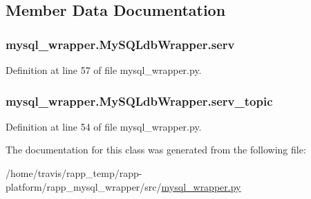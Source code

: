 \subsection{Member Data Documentation}
\hypertarget{classmysql__wrapper_1_1MySQLdbWrapper_ad3f471033029f6ca7487fa7e32ba533b}{
\subsubsection[{serv}]{\setlength{\rightskip}{0pt plus 5cm}mysql\-\_\-wrapper.\-My\-S\-Q\-Ldb\-Wrapper.\-serv}}\label{classmysql__wrapper_1_1MySQLdbWrapper_ad3f471033029f6ca7487fa7e32ba533b}


Definition at line 57 of file mysql\-\_\-wrapper.\-py.

\hypertarget{classmysql__wrapper_1_1MySQLdbWrapper_a63992807961399f3fbd3f963daad8cc1}{
\subsubsection[{serv\-\_\-topic}]{\setlength{\rightskip}{0pt plus 5cm}mysql\-\_\-wrapper.\-My\-S\-Q\-Ldb\-Wrapper.\-serv\-\_\-topic}}\label{classmysql__wrapper_1_1MySQLdbWrapper_a63992807961399f3fbd3f963daad8cc1}


Definition at line 54 of file mysql\-\_\-wrapper.\-py.



The documentation for this class was generated from the following file\-:\begin{DoxyCompactItemize}
\item 
/home/travis/rapp\-\_\-temp/rapp-\/platform/rapp\-\_\-mysql\-\_\-wrapper/src/\hyperlink{mysql__wrapper_8py}{mysql\-\_\-wrapper.\-py}\end{DoxyCompactItemize}
